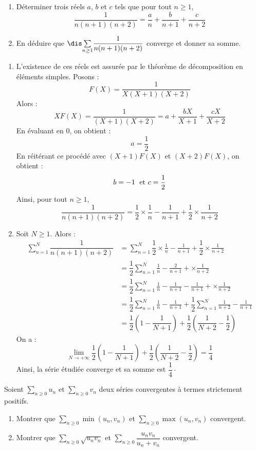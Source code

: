 \documentclass[a4paper,10pt]{report}
\newcommand{\Sum}[2]{\ensuremath{\textstyle{\sum\limits_{#1}^{#2}}}}
\begin{document}
\begin{Exa} 
\begin{enumerate}
\item Déterminer trois réels $a$, $b$ et $c$ tels que pour tout $n \geq 1$,
$$ \frac{1}{n(n+1)(n+2)} = \frac{a}{n} + \frac{b}{n+1} + \frac{c}{n+2}$$
\item En déduire que $\dis \Sum{n \geq 1}{} \dfrac{1}{n(n+1)(n+2)}$ converge et donner sa somme.
\end{enumerate}
\end{Exa}

\corr 
\begin{enumerate}
\item L'existence de ces réels est assurée par le théorème de décomposition en éléments simples. Posons :
$$ F(X) = \dfrac{1}{X(X+1)(X+2)}$$
Alors :
$$ XF(X) = \dfrac{1}{(X+1)(X+2)} = a + \dfrac{bX}{X+1} + \dfrac{cX}{X+2}$$
En évaluant en $0$, on obtient :
$$ a = \dfrac{1}{2}$$
En réitérant ce procédé avec $(X+1)F(X)$ et $(X+2)F(X)$, on obtient :
$$ b = -1 \; \hbox{ et } c = \dfrac{1}{2}$$
Ainsi, pour tout $n \geq 1$,
$$  \frac{1}{n(n+1)(n+2)} = \dfrac{1}{2} \times \frac{1}{n} - \frac{1}{n+1}  +\dfrac{1}{2} \times \frac{1}{n+2}$$
\item Soit $N \geq 1$. Alors :
\begin{align*}
\sum_{n=1}^N \dfrac{1}{n(n+1)(n+2)} & = \sum_{n=1}^N  \dfrac{1}{2} \times \frac{1}{n} - \frac{1}{n+1} + \dfrac{1}{2} \times \frac{1}{n+2} \\
& = \dfrac{1}{2} \sum_{n=1}^N  \frac{1}{n} - \frac{2}{n+1}  +\times \frac{1}{n+2} \\
& = \dfrac{1}{2} \sum_{n=1}^N  \frac{1}{n} - \frac{1}{n+1} - \frac{1}{n+1}  +\times \frac{1}{n+2} \\
& =  \dfrac{1}{2} \sum_{n=1}^N  \frac{1}{n} - \frac{1}{n+1} +  \dfrac{1}{2} \sum_{n=1}^N   \frac{1}{n+2} - \frac{1}{n+1}  \\
& = \dfrac{1}{2} \left(1 - \dfrac{1}{N+1} \right) + \dfrac{1}{2} \left( \dfrac{1}{N+2} - \dfrac{1}{2} \right)
\end{align*}
On a :
$$ \lim_{N \rightarrow + \infty} \dfrac{1}{2} \left(1 - \dfrac{1}{N+1} \right) + \dfrac{1}{2} \left( \dfrac{1}{N+2} - \dfrac{1}{2} \right) = \dfrac{1}{4}$$
Ainsi, la série étudiée converge et sa somme est $\dfrac{1}{4} \cdot$
\end{enumerate}

\begin{Exa} Soient $\Sum{n \geq 0}{} u_n$ et $\Sum{n \geq 0}{} v_n$ deux séries convergentes à termes strictement positifs.
\begin{enumerate}
\item Montrer que $\Sum{n \geq 0}{} \min(u_n,v_n)$ et $\Sum{n \geq 0}{} \max(u_n,v_n)$ convergent.
\item Montrer que $\Sum{n \geq 0}{} \sqrt{u_n v_n}$ et $\Sum{n \geq 0}{} \dfrac{u_n v_n}{u_n+v_n}$ convergent.
\end{enumerate}
\end{Exa}
\end{document}
